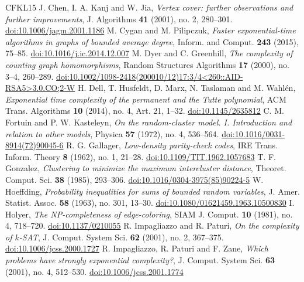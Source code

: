 \begin{thebibliography}{CFKL15}
 J. Chen, I. A. Kanj and W. Jia, \emph{Vertex cover: further observations and further improvements}, J. Algorithms \textbf{41} (2001), no. 2, 280--301. \href{https://doi.org/10.1006/jagm.2001.1186}{doi:10.1006/jagm.2001.1186}
 M. Cygan and M. Pilipczuk, \emph{Faster exponential-time algorithms in graphs of bounded average degree}, Inform. and Comput. \textbf{243} (2015), 75--85. \href{https://doi.org/10.1016/j.ic.2014.12.007}{doi:10.1016/j.ic.2014.12.007}
 M. Dyer and C. Greenhill, \emph{The complexity of counting graph homomorphisms}, Random Structures Algorithms \textbf{17} (2000), no. 3--4, 260--289. \href{https://doi.org/10.1002/1098-2418(200010/12)17:3/4<260::AID-RSA5>3.0.CO;2-W}{doi:10.1002/1098-2418(200010/12)17:3/4<260::AID-RSA5>3.0.CO;2-W}
 H. Dell, T. Husfeldt, D. Marx, N. Taslaman and M. Wahl\'en, \emph{Exponential time complexity of the permanent and the Tutte polynomial}, ACM Trans. Algorithms \textbf{10} (2014), no. 4, Art. 21, 1--32. \href{https://doi.org/10.1145/2635812}{doi:10.1145/2635812}
 C. M. Fortuin and P. W. Kasteleyn, \emph{On the random-cluster model. I. Introduction and relation to other models}, Physica \textbf{57} (1972), no. 4, 536--564. \href{https://doi.org/10.1016/0031-8914(72)90045-6}{doi:10.1016/0031-8914(72)90045-6}
 R. G. Gallager, \emph{Low-density parity-check codes}, IRE Trans. Inform. Theory \textbf{8} (1962), no. 1, 21--28. \href{https://doi.org/10.1109/TIT.1962.1057683}{doi:10.1109/TIT.1962.1057683}
 T. F. Gonzalez, \emph{Clustering to minimize the maximum intercluster distance}, Theoret. Comput. Sci. \textbf{38} (1985), 293--306. \href{https://doi.org/10.1016/0304-3975(85)90224-5}{doi:10.1016/0304-3975(85)90224-5}
 W. Hoeffding, \emph{Probability inequalities for sums of bounded random variables}, J. Amer. Statist. Assoc. \textbf{58} (1963), no. 301, 13--30. \href{https://doi.org/10.1080/01621459.1963.10500830}{doi:10.1080/01621459.1963.10500830}
 I. Holyer, \emph{The NP-completeness of edge-coloring}, SIAM J. Comput. \textbf{10} (1981), no. 4, 718--720. \href{https://doi.org/10.1137/0210055}{doi:10.1137/0210055}
 R. Impagliazzo and R. Paturi, \emph{On the complexity of $k$-SAT}, J. Comput. System Sci. \textbf{62} (2001), no. 2, 367--375. \href{https://doi.org/10.1006/jcss.2000.1727}{doi:10.1006/jcss.2000.1727}
 R. Impagliazzo, R. Paturi and F. Zane, \emph{Which problems have strongly exponential complexity?}, J. Comput. System Sci. \textbf{63} (2001), no. 4, 512--530. \href{https://doi.org/10.1006/jcss.2001.1774}{doi:10.1006/jcss.2001.1774}

\end{thebibliography}
